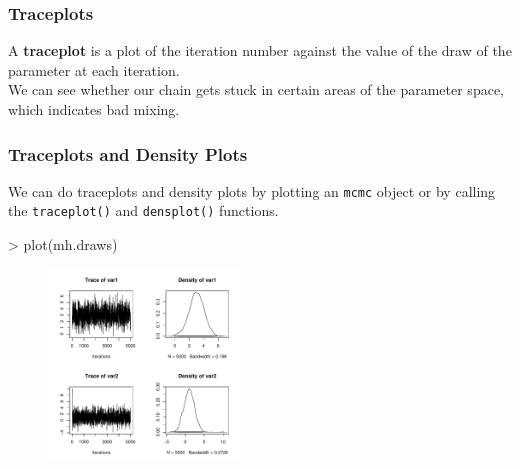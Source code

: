 \documentclass[handout]{beamer}
\begin{document}
\begin{frame}
\frametitle{Traceplots}
\pause
A \textbf{traceplot} is a plot of the iteration number against the
value of the draw of the parameter at each iteration.\\
\pause
\bigskip
We can see whether our chain gets stuck in certain areas of the
parameter space, which indicates bad mixing.

\pause

\begin{figure}[!htp]
\begin{center}
\end{center}
\end{figure}
\end{frame}

\begin{frame}[fragile]
\frametitle{Traceplots and Density Plots}
\pause
We can do traceplots and density plots by plotting an {\tt mcmc}
object or by calling the {\tt traceplot()} and {\tt densplot()} functions.
\pause
\medskip
\tiny
\begin{Schunk}
\begin{Sinput}
> plot(mh.draws)
\end{Sinput}
\end{Schunk}
\begin{figure}[!htp]
\begin{center}
\includegraphics[width=2in, height=2in]{convergence-trace.pdf}
\end{center}
\end{figure}
\normalsize
\end{frame}
\end{document}
